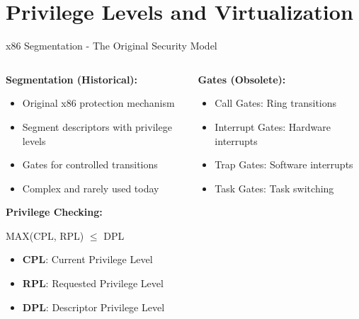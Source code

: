 \documentclass[aspectratio=169,12pt]{beamer}
\begin{document}
\section{Privilege Levels and Virtualization}

\begin{frame}{x86 Segmentation - The Original Security Model}
    \begin{columns}
        \begin{column}{0.5\textwidth}
            \textbf{Segmentation (Historical):}
            \begin{itemize}
                \item Original x86 protection mechanism
                \item Segment descriptors with privilege levels
                \item Gates for controlled transitions
                \item Complex and rarely used today
            \end{itemize}
            
            \vspace{0.3cm}
            \textbf{Privilege Checking:}
            \begin{tcolorbox}[colback=yellow!20]
                MAX(CPL, RPL) $\leq$ DPL
            \end{tcolorbox}
            \begin{itemize}
                \item \textbf{CPL}: Current Privilege Level
                \item \textbf{RPL}: Requested Privilege Level
                \item \textbf{DPL}: Descriptor Privilege Level
            \end{itemize}
        \end{column}
        \begin{column}{0.5\textwidth}
            \textbf{Gates (Obsolete):}
            \begin{itemize}
                \item Call Gates: Ring transitions
                \item Interrupt Gates: Hardware interrupts
                \item Trap Gates: Software interrupts
                \item Task Gates: Task switching
            \end{itemize}
            

\end{column}
\end{columns}
\end{frame}
\end{document}
